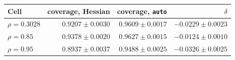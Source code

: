 \begin{tabular}{lrrr}
\toprule
Cell & coverage, Hessian & coverage, \texttt{auto} & $\delta$ \\
\midrule
$\rho = 0.3028$ & $0.9207 \pm 0.0030$ & $0.9609 \pm 0.0017$ & $-0.0229 \pm 0.0023$ \\
$\rho = 0.85$ & $0.9378 \pm 0.0020$ & $0.9627 \pm 0.0015$ & $-0.0124 \pm 0.0010$ \\
$\rho = 0.95$ & $0.8937 \pm 0.0037$ & $0.9488 \pm 0.0025$ & $-0.0326 \pm 0.0025$ \\
\bottomrule
\end{tabular}
